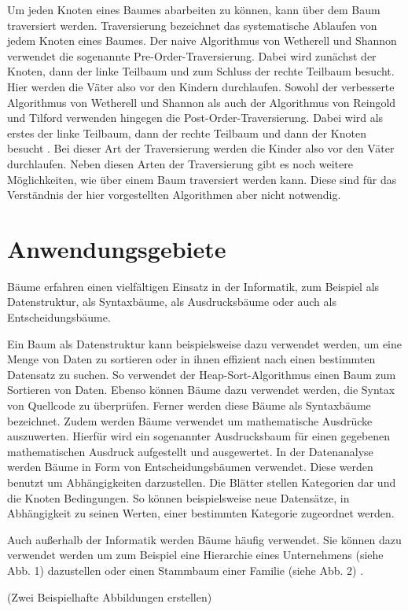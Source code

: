 Um jeden Knoten eines Baumes abarbeiten zu können, kann über dem Baum 
traversiert werden. Traversierung bezeichnet das systematische Ablaufen 
von jedem Knoten eines Baumes. Der naive Algorithmus
von Wetherell und Shannon verwendet die sogenannte
Pre-Order-Traversierung. Dabei wird zunächst der Knoten, dann der linke Teilbaum
und zum Schluss der rechte Teilbaum besucht. Hier werden die Väter also vor den
Kindern durchlaufen. Sowohl der verbesserte Algorithmus von Wetherell 
und Shannon als auch der Algorithmus von Reingold und Tilford verwenden hingegen die 
Post-Order-Traversierung. Dabei wird als erstes der linke Teilbaum, dann der 
rechte Teilbaum und dann der Knoten besucht \cite[]{q4}. Bei dieser Art der 
Traversierung werden die Kinder also vor den Väter durchlaufen. Neben diesen Arten
der Traversierung gibt es noch weitere Möglichkeiten, wie über einem 
Baum traversiert werden kann. Diese sind für das Verständnis der hier 
vorgestellten Algorithmen aber nicht notwendig.


\section{Anwendungsgebiete}

Bäume erfahren einen vielfältigen Einsatz in der Informatik, zum Beispiel 
als Datenstruktur, als Syntaxbäume, als Ausdrucksbäume oder auch als 
Entscheidungsbäume.

Ein Baum als Datenstruktur kann beispielsweise dazu verwendet werden, 
um eine Menge von Daten zu sortieren oder in ihnen effizient nach einen 
bestimmten Datensatz zu suchen. So verwendet der Heap-Sort-Algorithmus 
einen Baum zum Sortieren von Daten. Ebenso können Bäume dazu verwendet 
werden, die Syntax von Quellcode zu überprüfen. Ferner werden diese Bäume 
als Syntaxbäume bezeichnet. Zudem werden Bäume verwendet um mathematische 
Ausdrücke auszuwerten. Hierfür wird ein sogenannter Ausdrucksbaum für einen 
gegebenen mathematischen Ausdruck aufgestellt und ausgewertet. In der 
Datenanalyse werden Bäume in Form von Entscheidungsbäumen verwendet. 
Diese werden benutzt um Abhängigkeiten darzustellen. Die Blätter stellen 
Kategorien dar und die Knoten Bedingungen. So können beispielsweise neue 
Datensätze, in Abhängigkeit zu seinen Werten, einer bestimmten Kategorie 
zugeordnet werden.

Auch außerhalb der Informatik werden Bäume häufig verwendet. Sie können 
dazu verwendet werden um zum Beispiel eine Hierarchie eines Unternehmens 
(siehe Abb. 1) dazustellen oder einen Stammbaum einer 
Familie (siehe Abb. 2) \cite[]{q4}.

(Zwei Beispielhafte Abbildungen erstellen)
